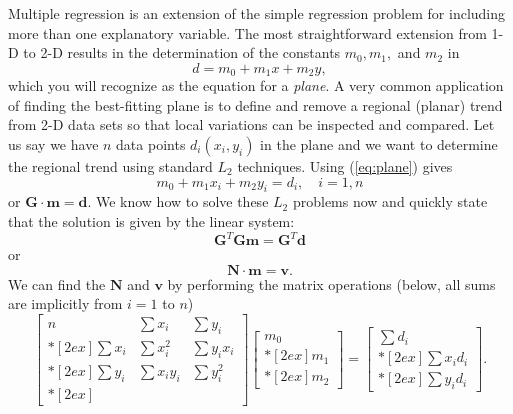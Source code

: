 	Multiple regression is an extension of the simple regression problem for including more than 
one explanatory variable.  The most straightforward extension from 1-D to 2-D results in the 
determination of the constants $m_0, m_1,$ and $m_2$ in
\begin{equation}
d = m_0 + m_1 x + m_2 y,
\label{eq:plane}
\end{equation}
which you will recognize as the equation for a \emph{plane}.  A very common application of finding the 
best-fitting plane is to define and remove a regional (planar) trend from 2-D data sets so that 
local variations can be inspected and compared.  Let us say we have $n$ data points $d_i(x_i, y_i)$ in the 
plane and we want to determine the regional trend using standard $L_2$ techniques.  Using (\ref{eq:plane}) 
gives
\begin{equation}
m_0 + m_1 x_i + m_2 y_i = d_i,\quad i = 1,n
\end{equation}
or $\mathbf{G\cdot m=d}$.  We know how to solve these $L_2$ problems now and quickly state that the solution is 
given by the linear system:
\begin{equation}
\mathbf{G}^T \mathbf{Gm = G}^T \mathbf{d}
\end{equation}
or 
\begin{equation}
\mathbf{	N\cdot m = v}.
\end{equation}
We can find the $\mathbf{N}$ and $\mathbf{v}$ by performing the matrix operations (below, all sums are implicitly from $i = 1$ to $n$)
\begin{equation}
\left [ \begin{array}{ccc}
n & \displaystyle \sum x_i & \displaystyle \sum y_i \\*[2ex]
\displaystyle \sum x_i & \displaystyle \sum x^2_i & \displaystyle \sum y_i x_i \\*[2ex]
\displaystyle \sum y_i & \displaystyle \sum x_i y_i & \displaystyle \sum y^2_i \\*[2ex]
\end{array} \right ]
\left[ \begin{array}{c}
m_0 \\*[2ex]
m_1 \\*[2ex]
m_2 
\end{array} \right]  = 
\left[ \begin{array}{c}
\displaystyle \sum d_i \\*[2ex] \displaystyle \sum x_i d_i\\*[2ex] 
\displaystyle \sum y_i d_i
\end{array} \right ].
\end{equation}	 
